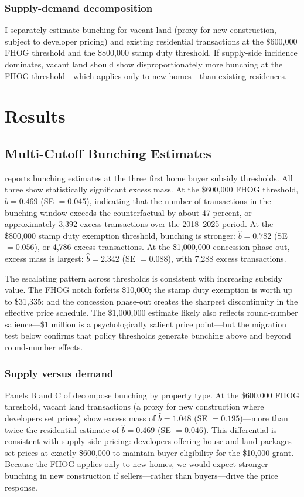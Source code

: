 \documentclass[12pt]{article}
\begin{document}
\subsubsection*{Supply-demand decomposition} I separately estimate bunching for vacant land (proxy for new construction, subject to developer pricing) and existing residential transactions at the \$600,000 FHOG threshold and the \$800,000 stamp duty threshold. If supply-side incidence dominates, vacant land should show disproportionately more bunching at the FHOG threshold---which applies only to new homes---than existing residences.


\section{Results}

\subsection{Multi-Cutoff Bunching Estimates}

 reports bunching estimates at the three first home buyer subsidy thresholds. All three show statistically significant excess mass. At the \$600,000 FHOG threshold, $\hat{b} = 0.469$ (SE $= 0.045$), indicating that the number of transactions in the bunching window exceeds the counterfactual by about 47 percent, or approximately 3,392 excess transactions over the 2018--2025 period. At the \$800,000 stamp duty exemption threshold, bunching is stronger: $\hat{b} = 0.782$ (SE $= 0.056$), or 4,786 excess transactions. At the \$1,000,000 concession phase-out, excess mass is largest: $\hat{b} = 2.342$ (SE $= 0.088$), with 7,288 excess transactions.

The escalating pattern across thresholds is consistent with increasing subsidy value. The FHOG notch forfeits \$10,000; the stamp duty exemption is worth up to \$31,335; and the concession phase-out creates the sharpest discontinuity in the effective price schedule. The \$1,000,000 estimate likely also reflects round-number salience---\$1 million is a psychologically salient price point---but the migration test below confirms that policy thresholds generate bunching above and beyond round-number effects.



\subsubsection*{Supply versus demand} Panels B and C of  decompose bunching by property type. At the \$600,000 FHOG threshold, vacant land transactions (a proxy for new construction where developers set prices) show excess mass of $\hat{b} = 1.048$ (SE $= 0.195$)---more than twice the residential estimate of $\hat{b} = 0.469$ (SE $= 0.046$). This differential is consistent with supply-side pricing: developers offering house-and-land packages set prices at exactly \$600,000 to maintain buyer eligibility for the \$10,000 grant. Because the FHOG applies only to new homes, we would expect stronger bunching in new construction if sellers---rather than buyers---drive the price response.
\end{document}
